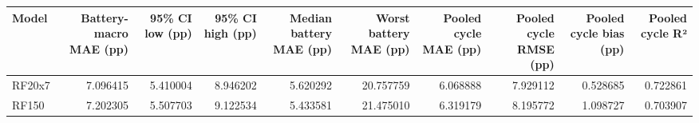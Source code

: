 \begin{tabular}{lrrrrrrrrr}
\toprule
Model & Battery-macro MAE (pp) & 95\% CI low (pp) & 95\% CI high (pp) & Median battery MAE (pp) & Worst battery MAE (pp) & Pooled cycle MAE (pp) & Pooled cycle RMSE (pp) & Pooled cycle bias (pp) & Pooled cycle R² \\
\midrule
RF20x7 & 7.096415 & 5.410004 & 8.946202 & 5.620292 & 20.757759 & 6.068888 & 7.929112 & 0.528685 & 0.722861 \\
RF150 & 7.202305 & 5.507703 & 9.122534 & 5.433581 & 21.475010 & 6.319179 & 8.195772 & 1.098727 & 0.703907 \\
\bottomrule
\end{tabular}
